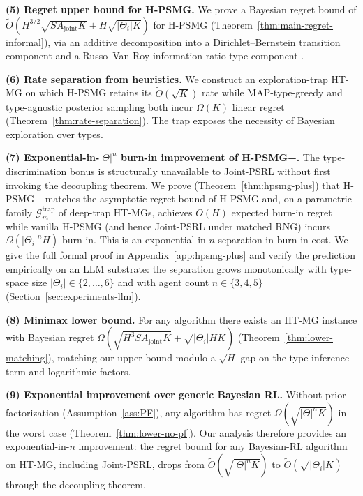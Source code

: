 \documentclass{article}
\def\textsuperscript#1{#1}%
\begin{document}
\textbf{(5) Regret upper bound for H-PSMG.} We prove a Bayesian regret bound of $\tilde O(H^{3/2}\sqrt{SA_{\mathrm{joint}}K} + H\sqrt{|\Theta_i| K})$ for H-PSMG (Theorem~\ref{thm:main-regret-informal}), via an additive decomposition into a Dirichlet--Bernstein transition component and a Russo--Van Roy information-ratio type component \citep{russo2014learning,russo2016information}.

\textbf{(6) Rate separation from heuristics.} We construct an exploration-trap HT-MG on which H-PSMG retains its $\tilde O(\sqrt{K})$ rate while MAP-type-greedy and type-agnostic posterior sampling both incur $\Omega(K)$ linear regret (Theorem~\ref{thm:rate-separation}). The trap exposes the necessity of Bayesian exploration over types.

\textbf{(7) Exponential-in-$|\Theta|^n$ burn-in improvement of H-PSMG\textsuperscript{+}.} The type-discrimination bonus is structurally unavailable to Joint-PSRL without first invoking the decoupling theorem. We prove (Theorem~\ref{thm:hpsmg-plus}) that H-PSMG\textsuperscript{+} matches the asymptotic regret bound of H-PSMG and, on a parametric family $\mathcal{G}_m^{\mathrm{trap}}$ of deep-trap HT-MGs, achieves $O(H)$ expected burn-in regret while vanilla H-PSMG (and hence Joint-PSRL under matched RNG) incurs $\Omega(|\Theta_i|^n H)$ burn-in. This is an exponential-in-$n$ separation in burn-in cost. We give the full formal proof in Appendix~\ref{app:hpsmg-plus} and verify the prediction empirically on an LLM substrate: the separation grows monotonically with type-space size $|\Theta_i| \in \{2, \ldots, 6\}$ and with agent count $n \in \{3, 4, 5\}$ (Section~\ref{sec:experiments-llm}).

\textbf{(8) Minimax lower bound.} For any algorithm there exists an HT-MG instance with Bayesian regret $\Omega(\sqrt{H^3 S A_{\mathrm{joint}} K} + \sqrt{|\Theta_i| HK})$ (Theorem~\ref{thm:lower-matching}), matching our upper bound modulo a $\sqrt{H}$ gap on the type-inference term and logarithmic factors.

\textbf{(9) Exponential improvement over generic Bayesian RL.} Without prior factorization (Assumption~\ref{ass:PF}), any algorithm has regret $\Omega(\sqrt{|\Theta|^n K})$ in the worst case (Theorem~\ref{thm:lower-no-pf}). Our analysis therefore provides an exponential-in-$n$ improvement: the regret bound for any Bayesian-RL algorithm on HT-MG, including Joint-PSRL, drops from $\tilde O(\sqrt{|\Theta|^n K})$ to $\tilde O(\sqrt{|\Theta_i| K})$ through the decoupling theorem.
\end{document}
